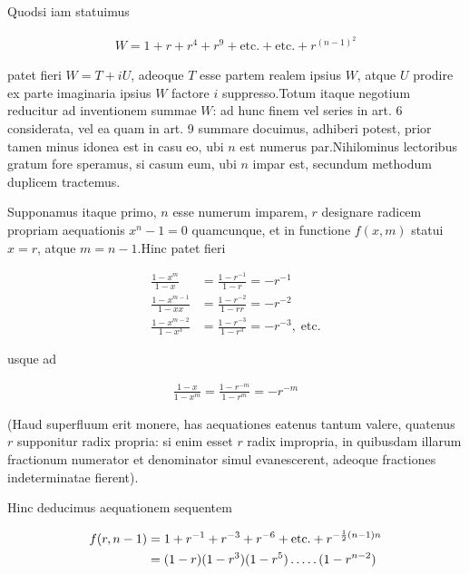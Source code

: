 
Quodsi iam statuimus

\[
\begin{aligned}
W=1+r+r^4+r^9+\text{etc.}+\text{etc.}+r^{(n-1)^2}
\end{aligned}
\]

patet fieri $W=T+iU$, adeoque $T$ esse partem realem ipsius $W$, atque $U$ prodire ex parte imaginaria ipsius $W$ factore $i$ suppresso.\quad Totum itaque negotium reducitur ad inventionem summae $W$: ad hunc finem vel series in art. 6 considerata, vel ea quam in art. 9 summare docuimus, adhiberi potest, prior tamen minus idonea est in casu eo, ubi $n$ est numerus par.\quad Nihilominus lectoribus gratum fore speramus, si casum eum, ubi $n$ impar est, secundum methodum duplicem tractemus.

Supponamus itaque primo, $n$ esse numerum imparem, $r$ designare radicem propriam aequationis $x^n-1=0$ quamcunque, et in functione $f(x,m)$ statui $x=r$, atque $m=n-1$.\quad Hinc patet fieri

\[
\begin{aligned}
\frac{1-x^m}{1-x}&=\frac{1-r^{-1}}{1-r}=-r^{-1}\\
\frac{1-x^{m-1}}{1-xx}&=\frac{1-r^{-2}}{1-rr}=-r^{-2}\\
\frac{1-x^{m-2}}{1-x^3}&=\frac{1-r^{-3}}{1-r^3}=-r^{-3},\;\text{etc.}
\end{aligned}
\]

usque ad

\[
\begin{aligned}
\frac{1-x}{1-x^m}=\frac{1-r^{-m}}{1-r^m}=-r^{-m}
\end{aligned}
\]

(Haud superfluum erit monere, has aequationes eatenus tantum valere, quatenus $r$ supponitur radix propria: si enim esset $r$ radix impropria, in quibusdam illarum fractionum numerator et denominator simul evanescerent, adeoque fractiones indeterminatae fierent).

Hinc deducimus aequationem sequentem

%
\[
\begin{aligned}
f(r,n-1)&=1+r^{-1}+r^{-3}+r^{-6}+\text{etc.}+r^{-\frac12(n-1)n}\\
&=(1-r)(1-r^3)(1-r^5)\mathinner{.\,.\,.\,.\,.}(1-r^{n-2})
\end{aligned}
\]


